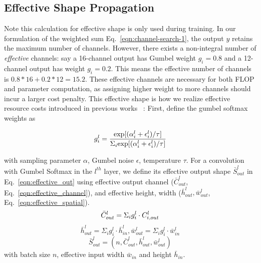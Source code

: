 \documentclass[10pt,twocolumn,letterpaper]{article}
\begin{document}
\subsection{Effective Shape Propagation}

Note this calculation for effective shape is only used during training. In our formulation of the weighted sum Eq.~\ref{eqn:channel-search-1}, the output $y$ retains the maximum number of channels. However, there exists a non-integral number of \textit{effective} channels: say a 16-channel output has Gumbel weight $g_i = 0.8$ and a 12-channel output has weight $g_i = 0.2$. This means the effective number of channels is $0.8 * 16 + 0.2 * 12 = 15.2$. These effective channels are necessary for both FLOP and parameter computation, as assigning higher weight to more channels should incur a larger cost penalty. This effective shape is how we realize effective resource costs introduced in previous works ~\cite{fbnet, snas}: First, define the gumbel softmax weights as

\begin{equation}\label{eqn:gumbel}
g^{l}_{i} = \frac{\text{exp}[(\alpha^{l}_{i} + \epsilon^{l}_{i}) / \tau]}
   {\Sigma_{i} \text{exp}[(\alpha^{l}_{i} + \epsilon^{l}_{i}) / \tau]}\\
\end{equation}

with sampling parameter $\alpha$, Gumbel noise $\epsilon$, temperature $\tau$. For a convolution with Gumbel Softmax in the $l^{th}$ layer, we define its effective output shape $\bar{S}^{l}_{out}$ in Eq.~\ref{eqn:effective_out} using effective output channel ($\bar{C}^{l}_{out}$, Eq.~\ref{eqn:effective_channel}), and effective height, width ($\bar{h}^{l}_{out}, \bar{w}^{l}_{out}$, Eq.~\ref{eqn:effective_spatial}).
\begin{equation}
\label{eqn:effective_channel}
     \bar{C}^{l}_{out} = \Sigma_{i} g^{l}_{i}\cdot C^{l}_{i, out} \\
\end{equation}
\begin{equation}\label{eqn:effective_spatial}
\bar{h}^{l}_{out} = \Sigma_{i} g^{l}_{i}\cdot \bar{h}^{l}_{in}, \bar{w}^{l}_{out} = \Sigma_{i} g^{l}_{i}\cdot \bar{w}^{l}_{in}
\end{equation}
\begin{equation}\label{eqn:effective_out}
    \bar{S}^{l}_{out} = (n, \bar{C}^{l}_{out}, \bar{h}^{l}_{out}, \bar{w}^{l}_{out})
\end{equation}
with batch size $n$, effective input width $\bar{w}_{in}$ and height $\bar{h}_{in}$.
\end{document}
